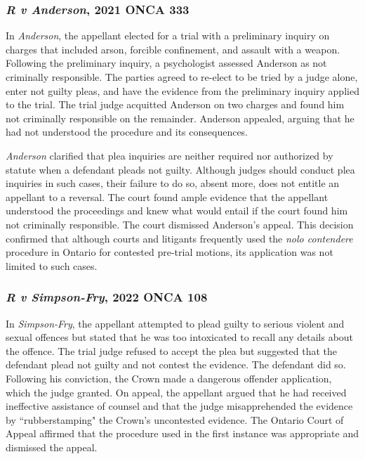 \subsubsection{\textit{R v Anderson}, 2021 ONCA 333}

In \textit{Anderson}, the appellant elected for a trial with a preliminary inquiry on charges that included arson, forcible confinement, and assault with a weapon. Following the preliminary inquiry, a psychologist assessed Anderson as not criminally responsible. The parties agreed to re-elect to be tried by a judge alone, enter not guilty pleas, and have the evidence from the preliminary inquiry applied to the trial. The trial judge acquitted Anderson on two charges and found him not criminally responsible on the remainder. Anderson appealed, arguing that he had not understood the procedure and its consequences.

\textit{Anderson} clarified that plea inquiries are neither required nor authorized by statute when a defendant pleads not guilty. Although judges should conduct plea inquiries in such cases, their failure to do so, absent more, does not entitle an appellant to a reversal. The court found ample evidence that the appellant understood the proceedings and knew what would entail if the court found him not criminally responsible. The court dismissed Anderson's appeal. This decision confirmed that although courts and litigants frequently used the \textit{nolo contendere} procedure in Ontario for contested pre-trial motions, its application was not limited to such cases.

\subsubsection{\textit{R v Simpson-Fry}, 2022 ONCA 108}

In \textit{Simpson-Fry}, the appellant attempted to plead guilty to serious violent and sexual offences but stated that he was too intoxicated to recall any details about the offence. The trial judge refused to accept the plea but suggested that the defendant plead not guilty and not contest the evidence. The defendant did so. Following his conviction, the Crown made a dangerous offender application, which the judge granted. On appeal, the appellant argued that he had received ineffective assistance of counsel and that the judge misapprehended the evidence by ``rubberstamping" the Crown's uncontested evidence. The Ontario Court of Appeal affirmed that the procedure used in the first instance was appropriate and dismissed the appeal.

